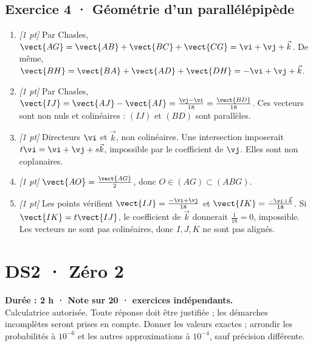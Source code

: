 \subsection*{Exercice 4 · Géométrie d'un parallélépipède}\begin{enumerate}

\item \textit{[1 pt]} Par Chasles, $\vect{AG}=\vect{AB}+\vect{BC}+\vect{CG}=\vi +\vj +\vec k$. De même, $\vect{BH}=\vect{BA}+\vect{AD}+\vect{DH}=-\vi +\vj +\vec k$.

\item \textit{[1 pt]} Par Chasles, $\vect{IJ}=\vect{AJ}-\vect{AI}=\frac{\vj -\vi }{18}=\frac{\vect{BD}}{18}$. Ces vecteurs sont non nuls et colinéaires : $(IJ)$ et $(BD)$ sont parallèles.

\item \textit{[1 pt]} Directeurs $\vi $ et $\vec k$, non colinéaires. Une intersection imposerait $t\vi =\vi +\vj +s\vec k$, impossible par le coefficient de $\vj $. Elles sont non coplanaires.

\item \textit{[1 pt]} $\vect{AO}=\frac{\vect{AG}}{2}$, donc $O\in(AG)\subset(ABG)$.

\item \textit{[1 pt]} Les points vérifient $\vect{IJ}=\frac{-\vi +\vj }{18}$ et $\vect{IK}=\frac{-\vi +\vec k}{18}$. Si $\vect{IK}=t\vect{IJ}$, le coefficient de $\vec k$ donnerait $\frac{1}{18}=0$, impossible. Les vecteurs ne sont pas colinéaires, donc $I,J,K$ ne sont pas alignés.

\end{enumerate}

\fi

\mxnewpage{}\label{sujet:2-2}

\section*{DS2 · Zéro 2}


\textbf{Durée : 2 h · Note sur 20 ·  exercices indépendants.}\\Calculatrice autorisée. Toute réponse doit être justifiée ; les démarches incomplètes seront prises en compte. Donner les valeurs exactes ; arrondir les probabilités à $10^{-6}$ et les autres approximations à $10^{-4}$, sauf précision différente.

